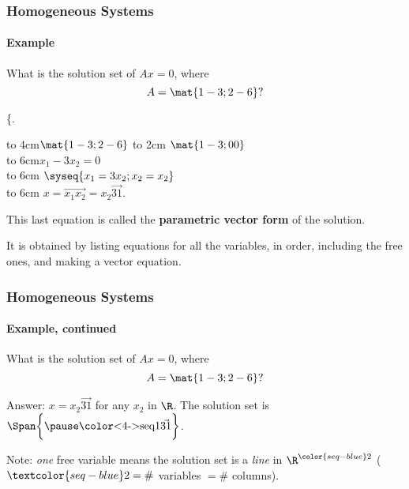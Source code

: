 
\begin{frame}
\frametitle{Homogeneous Systems}
\framesubtitle{Example}

\vskip-3mm
\begin{ques}
  What is the solution set of $Ax=0$, where
  \[ A = \mat{1 -3; 2 -6}? \]
\end{ques}

\spalignsysdelims\{.
\begin{webonly}
\leavevmode
\hbox to 4cm{\hfil$\mat{1 -3; 2 -6}$}%
\hbox to 2cm{\hfil{}}
\quad$\mat{1 -3; 0 0}$\\[1mm]
\leavevmode
\hbox to 6cm{\hfil\longsquiggly[equation]}\quad $x_1 - 3x_2= 0$\\[2mm]
\leavevmode
\hbox to 6cm{\hfil{}}\quad 
$\syseq{x_1 = 3x_2; x_2 = x_2}$\\[1mm]
\leavevmode
\hbox to 6cm{\hfil{}}\quad 
$x = \vec{x_1 x_2} = x_2\vec{3 1}$.
\end{webonly}

\pause\medskip
This last equation is called the \textbf{parametric vector form} of the
solution.

\pause\medskip
It is obtained by listing equations for all the variables, in order, including
the free ones, and making a vector equation.

\end{frame}



\begin{frame}
\frametitle{Homogeneous Systems}
\framesubtitle{Example, continued}

\vskip-3mm
\begin{ques}
  What is the solution set of $Ax=0$, where
  \[ A = \mat{1 -3; 2 -6}? \]
\end{ques}

\alert{Answer: } $x = x_2\vec{3 1}$ for any $x_2$ in $\R$.
\pause\def\r{\color<4->{seq1}}
The solution set is $\Span\biggl\{\pause\hbox{\r$\vec{3 1}$}\biggr\}$.

\pause\bigskip
\begin{center}
\end{center}

\pause\bigskip
\alert{Note:} \emph{one} free variable means the solution set is a \emph{line}
in $\R^{\color{seq-blue}2}$ ($\textcolor{seq-blue}2={}\#$ variables $=\#$
columns). 

\end{frame}


